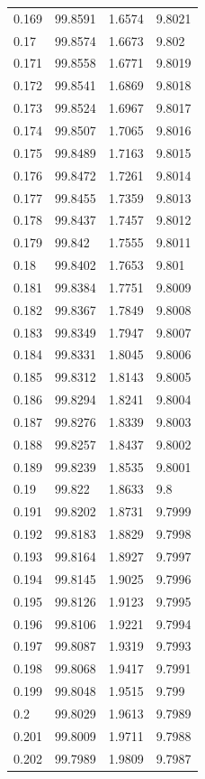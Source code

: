 \begin{tabular}{llll}
0.169 & 99.8591 & 1.6574 & 9.8021 \\
0.17 & 99.8574 & 1.6673 & 9.802 \\
0.171 & 99.8558 & 1.6771 & 9.8019 \\
0.172 & 99.8541 & 1.6869 & 9.8018 \\
0.173 & 99.8524 & 1.6967 & 9.8017 \\
0.174 & 99.8507 & 1.7065 & 9.8016 \\
0.175 & 99.8489 & 1.7163 & 9.8015 \\
0.176 & 99.8472 & 1.7261 & 9.8014 \\
0.177 & 99.8455 & 1.7359 & 9.8013 \\
0.178 & 99.8437 & 1.7457 & 9.8012 \\
0.179 & 99.842 & 1.7555 & 9.8011 \\
0.18 & 99.8402 & 1.7653 & 9.801 \\
0.181 & 99.8384 & 1.7751 & 9.8009 \\
0.182 & 99.8367 & 1.7849 & 9.8008 \\
0.183 & 99.8349 & 1.7947 & 9.8007 \\
0.184 & 99.8331 & 1.8045 & 9.8006 \\
0.185 & 99.8312 & 1.8143 & 9.8005 \\
0.186 & 99.8294 & 1.8241 & 9.8004 \\
0.187 & 99.8276 & 1.8339 & 9.8003 \\
0.188 & 99.8257 & 1.8437 & 9.8002 \\
0.189 & 99.8239 & 1.8535 & 9.8001 \\
0.19 & 99.822 & 1.8633 & 9.8 \\
0.191 & 99.8202 & 1.8731 & 9.7999 \\
0.192 & 99.8183 & 1.8829 & 9.7998 \\
0.193 & 99.8164 & 1.8927 & 9.7997 \\
0.194 & 99.8145 & 1.9025 & 9.7996 \\
0.195 & 99.8126 & 1.9123 & 9.7995 \\
0.196 & 99.8106 & 1.9221 & 9.7994 \\
0.197 & 99.8087 & 1.9319 & 9.7993 \\
0.198 & 99.8068 & 1.9417 & 9.7991 \\
0.199 & 99.8048 & 1.9515 & 9.799 \\
0.2 & 99.8029 & 1.9613 & 9.7989 \\
0.201 & 99.8009 & 1.9711 & 9.7988 \\
0.202 & 99.7989 & 1.9809 & 9.7987 \\

\end{tabular}
